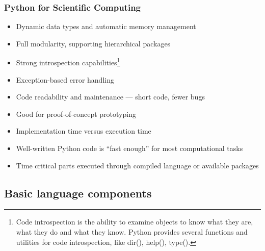 \begin{frame}
  \MyLogo
  \frametitle{Python for Scientific Computing}  

\small
\smallskip
{}
\begin{itemize}
	\item Dynamic data types and automatic memory management
	\item Full modularity, supporting hierarchical packages
	\item Strong introspection capabilities\footnote[frame]{\scriptsize\color{PineGreen}Code introspection is the ability to examine objects to know what they are, what they do and what they know. Python provides several functions and utilities for code introspection, like dir(), help(), type().}
	\item Exception-based error handling
\end{itemize}

\begin{itemize}
	\item Code readability and maintenance --- \alert{short code, fewer bugs}
	\item Good for proof-of-concept prototyping
	\item Implementation time versus execution time
	\item Well-written Python code is ``fast enough'' for most computational tasks
	\item Time critical parts executed through compiled language or \alert{available packages}
\end{itemize}

\end{frame}

\subsection{Basic language components}

